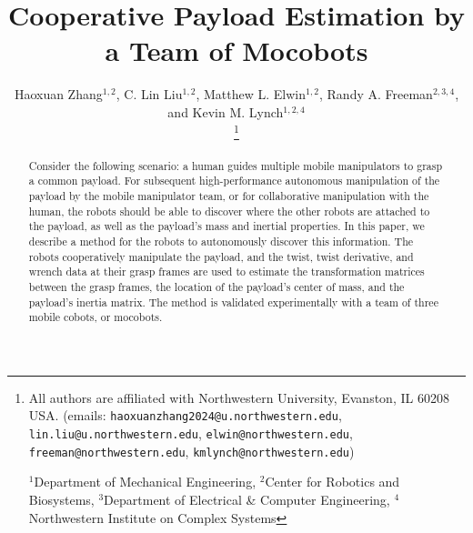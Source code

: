 \documentclass[letterpaper, 10 pt, journal, twoside]{IEEEtran}
\begin{document}

\title{Cooperative Payload Estimation by a Team of Mocobots}

\author{
Haoxuan Zhang$^{1,2}$, C. Lin Liu$^{1,2}$,  Matthew L. Elwin$^{1,2}$,  Randy A. Freeman$^{2,3,4}$, and Kevin M. Lynch$^{1,2,4}$

\thanks{All authors are affiliated with Northwestern University, Evanston, IL 60208 USA. (emails: {\tt\footnotesize haoxuanzhang2024@u.northwestern.edu}, {\tt\footnotesize lin.liu@u.northwestern.edu}, {\tt\footnotesize elwin@northwestern.edu}, {\tt\footnotesize freeman@northwestern.edu}, {\tt\footnotesize kmlynch@northwestern.edu})

$^1$Department of Mechanical Engineering, $^2$Center for Robotics and Biosystems, $^3$Department of Electrical \& Computer Engineering, $^4$Northwestern Institute on Complex Systems} %
} %



\maketitle \pagestyle{empty} \thispagestyle{empty}
\begin{abstract}
Consider the following scenario: a human guides multiple mobile manipulators to grasp a common payload. For subsequent high-performance autonomous manipulation of the payload by the mobile manipulator team, or for collaborative manipulation with the human, the robots should be able to discover where the other robots are attached to the payload, as well as the payload's mass and inertial properties. In this paper, we describe a method for the robots to autonomously discover this information. The robots cooperatively manipulate the payload, and the twist, twist derivative, and wrench data at their grasp frames are used to estimate the transformation matrices between the grasp frames, the location of the payload's center of mass, and the payload's inertia matrix. The method is validated experimentally with a team of three mobile cobots, or mocobots.

\end{abstract}
\end{document}
